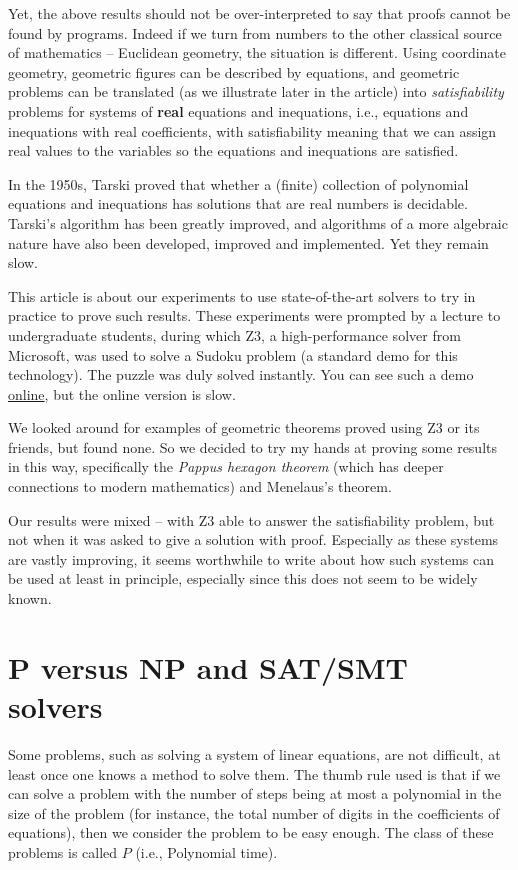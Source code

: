 \documentclass{amsart}
\theoremstyle{plain}
\theoremstyle{definition}
\theoremstyle{remark}
\begin{document}
Yet, the above results should not be over-interpreted to say that proofs
cannot be found by programs. Indeed if we turn from numbers to the other
classical source of mathematics -- Euclidean geometry, the situation is
different. Using coordinate geometry, geometric figures can be described by equations,
and geometric problems can be translated (as we illustrate later in the article) into
\emph{satisfiability} problems for systems of \textbf{real} equations and inequations, i.e.,
equations and inequations with real coefficients, with satisfiability meaning that we can
assign real values to the variables so the equations and inequations are satisfied.

In the 1950s, Tarski proved that whether a (finite)
collection of polynomial equations and inequations has solutions that
are real numbers is decidable.  Tarski's algorithm has been greatly improved,
and algorithms of a more algebraic nature have also been developed,
improved and implemented. Yet they remain slow.

This article is about our experiments to use
state-of-the-art solvers to try in practice to prove such results.
These experiments were prompted by a lecture
to undergraduate students, during which Z3, a high-performance
solver from Microsoft, was used to solve a Sudoku problem (a standard demo for
this technology). The puzzle was duly solved instantly. You can see such
a demo \href{https://rise4fun.com/Z3/Cs7p}{online}, but the online
version is slow.

We looked around for examples of geometric theorems proved using Z3 or
its friends, but found none. So we decided to try my hands at proving
some results in this way, specifically the \emph{Pappus hexagon theorem}
(which has deeper connections to modern mathematics) and Menelaus's theorem.

Our results were mixed -- with Z3 able to answer the satisfiability problem,
but not when it was asked to give a solution with proof.
Especially as these systems are vastly improving, it seems worthwhile to
write about how such systems can be used at least in principle,
especially since this does not seem to be widely known.

\hypertarget{p-versus-np-and-satsmt-solvers}{%
	\section{P versus NP and SAT/SMT
	  solvers}\label{p-versus-np-and-satsmt-solvers}}

Some problems, such as solving a system of linear equations, are not
difficult, at least once one knows a method to solve them. The thumb
rule used is that if we can solve a problem with the number of steps
being at most a polynomial in the size of the problem (for instance, the
total number of digits in the coefficients of equations), then we
consider the problem to be easy enough. The class of these problems is
called \(P\) (i.e., Polynomial time).
\end{document}
